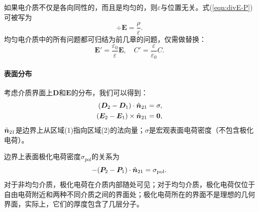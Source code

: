 如果电介质不仅是各向同性的，而且是均匀的，则$\varepsilon$与位置无关。式(\ref{eqn:divE-P})可被写为 
\begin{equation}
    \div\bm E=\frac\rho\varepsilon.
\end{equation}
均匀电介质中的所有问题都可归结为前几章的问题，仅需做替换：
\begin{equation}
    \bm E'=\frac{\varepsilon_0}\varepsilon\bm E,\quad C'=\frac\varepsilon{\varepsilon_0}C.
\end{equation}
\paragraph{表面分布}
考虑介质界面上$\bm D$和$\bm E$的分布，我们可以得到：
\begin{align}
    \label{eqn:Dn2-Dn1}
    (\bm D_2-\bm D_1)\cdot\mathop{}\!\hat{\bm n}_{21}&=\sigma,\\
    \label{eqn:Et2-Et1}
    (\bm E_2-\bm E_1)\times\mathop{}\!\hat{\bm n}_{21}&=\bm 0,
\end{align}
$\mathop{}\!\hat{\bm n}_{21}$是边界上从区域(1)指向区域(2)的法向量；$\sigma$是宏观表面电荷密度（不包含极化电荷）。

边界上表面极化电荷密度$\sigma_\text{pol}$的关系为
\begin{equation}
    \label{eqn:Pn2-Pn1}
    -(\bm P_2-\bm P_1)\cdot\mathop{}\!\hat{\bm n}_{21}=\sigma_\text{pol}.
\end{equation}
对于非均匀介质，极化电荷在介质内部随处可见；对于均匀介质，极化电荷仅位于自由电荷附近和两种不同介质之间的界面处；极化电荷所在的界面不是理想的几何界面，实际上，它们的厚度包含了几层分子。
